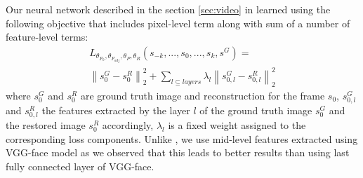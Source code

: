 Our neural network described in the section \ref{sec:video} in learned using the following objective that includes pixel-level term along with sum of a number of feature-level terms:
\begin{equation}
\label{eq:loss}
\begin{aligned}
    L_{\theta_{F_{0}}, \theta_{F_{adj}}, \theta_{P}, \theta_{R}}(s_{-k}, ..., s_{0}, ..., s_{k}, s^{G}) = \\ \left \| s_{0}^{G} - s_{0}^{R}\right \|^{2}_{2} + \sum_{l \subseteq {layers}}  {\lambda_l \left \| s_{0,l}^{G} - s_{0,l}^{R}\right \|^{2}_{2}}
\end{aligned}
\end{equation}
where $s_{0}^{G}$ and $s_{0}^{R}$ are ground truth image and reconstruction for the frame $s_{0}$, $s_{0, l}^{G}$  and $s_{0, l}^{R}$ the features extracted by the layer $l$ of the ground truth image  $s_{0}^{G}$ and the restored image  $s_{0}^{R}$ accordingly, $\lambda_l$ is a fixed weight assigned to the corresponding loss components. Unlike \cite{cole2017face}, we use mid-level features extracted using VGG-face model as we observed that this leads to better results than using last fully connected layer of VGG-face.